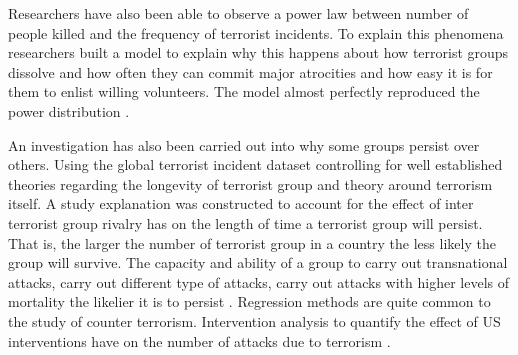 Researchers have also been able to observe a power law between number of people killed and the frequency of terrorist incidents. To explain this phenomena researchers built a model to explain why this happens about how terrorist groups  dissolve and how often they can commit major atrocities and how easy it is for them to enlist  willing volunteers. The model almost perfectly reproduced the power distribution \citep{clauset2005scale}.

An investigation has also been carried out into why some groups persist over others. Using the global terrorist incident dataset controlling for well established theories regarding the longevity of terrorist group and theory around terrorism itself. A study explanation was constructed to account for the effect of inter terrorist group rivalry has on the length of time a terrorist group will persist. That is, the larger the number of terrorist group in a country the less likely the group will survive. The capacity and ability of a group to carry out transnational attacks, carry out different type of attacks, carry out attacks with higher levels of mortality the likelier it is to persist \citep{young2014survival}. Regression methods are quite common to the study of counter terrorism. Intervention analysis to quantify the effect of US interventions have on the number of attacks due to terrorism \citep{enders1993effectiveness}.

